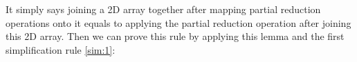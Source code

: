 \documentclass{l4proj}
\begin{document}
It simply says joining a 2D array together after mapping partial reduction operations onto it equals to applying the partial reduction operation after joining this 2D array. Then we can prove this rule by applying this lemma and the first simplification rule \ref{sim:1}:
\begin{code}%
\>[0]\<%
\\
\>[0]\AgdaSpace{}%
\AgdaSymbol{:}%
\>[2425I]\AgdaSymbol{\{}\AgdaSpace{}%
\AgdaSymbol{:}\AgdaSpace{}%
\AgdaSymbol{\}}\AgdaSpace{}%
\AgdaSpace{}%
\AgdaSymbol{\{}\AgdaSpace{}%
\AgdaSymbol{:}\AgdaSpace{}%
\AgdaSymbol{\}}\AgdaSpace{}%
\AgdaSpace{}%
\AgdaSymbol{(}\AgdaSpace{}%
\AgdaSymbol{:}\AgdaSpace{}%
\AgdaSymbol{)}\AgdaSpace{}%
\<%
\\
\>[.][@{}l@{}]\<[2425I]%
\>[20]\AgdaSymbol{(}\AgdaSpace{}%
\AgdaSymbol{:}\AgdaSpace{}%
\AgdaSpace{}%
\AgdaSymbol{)}\AgdaSpace{}%
\AgdaSpace{}%
\AgdaSymbol{(}\AgdaSpace{}%
\AgdaSymbol{:}\AgdaSpace{}%
\AgdaSpace{}%
\AgdaSpace{}%
\AgdaSymbol{(}\AgdaSpace{}%
\AgdaSpace{}%
\AgdaOperator{\AgdaPrimitive{*}}\AgdaSpace{}%
\AgdaSymbol{))}\AgdaSpace{}%
\<%
\\
%
\>[20]\AgdaSymbol{(}\AgdaSpace{}%
\AgdaSpace{}%
\AgdaSpace{}%
\AgdaSymbol{(}\AgdaSpace{}%
\AgdaSpace{}%
\AgdaSymbol{\{}\AgdaSymbol{\}}\AgdaSpace{}%
\AgdaSymbol{)}\AgdaSpace{}%
\AgdaSpace{}%
\AgdaSpace{}%
\AgdaSpace{}%
\AgdaSymbol{\{}\AgdaSpace{}%
\AgdaSymbol{\})}\AgdaSpace{}%
\AgdaSpace{}%
\<%
\\
%
\>[20]\AgdaSpace{}%
\AgdaSpace{}%
\AgdaSymbol{\{}\AgdaSymbol{\}}\AgdaSpace{}%
\AgdaSpace{}%
\<%
\\
\>[0]\AgdaSpace{}%
\AgdaSymbol{\{}\AgdaSymbol{\}}\AgdaSpace{}%
\AgdaSpace{}%
\AgdaSpace{}%
\AgdaSpace{}%

\end{code}
\end{document}
